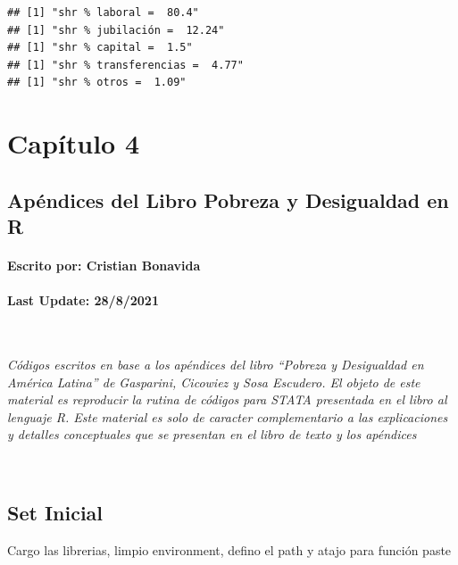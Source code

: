 \documentclass[
]{book}
\begin{document}
\begin{verbatim}
## [1] "shr % laboral =  80.4"
## [1] "shr % jubilación =  12.24"
## [1] "shr % capital =  1.5"
## [1] "shr % transferencias =  4.77"
## [1] "shr % otros =  1.09"
\end{verbatim}

\hypertarget{capuxedtulo-4}{%
\chapter{Capítulo 4}\label{capuxedtulo-4}}

\hypertarget{apuxe9ndices-del-libro-pobreza-y-desigualdad-en-r-2}{%
\section*{Apéndices del Libro Pobreza y Desigualdad en R}\label{apuxe9ndices-del-libro-pobreza-y-desigualdad-en-r-2}}

\hypertarget{escrito-por-cristian-bonavida-2}{%
\subsubsection*{Escrito por: Cristian Bonavida}\label{escrito-por-cristian-bonavida-2}}

\hypertarget{last-update-2882021}{%
\subsubsection*{Last Update: 28/8/2021}\label{last-update-2882021}}

~

\emph{Códigos escritos en base a los apéndices del libro ``Pobreza y Desigualdad en América Latina'' de Gasparini, Cicowiez y Sosa Escudero. El objeto de este material es reproducir la rutina de códigos para STATA presentada en el libro al lenguaje R. Este material es solo de caracter complementario a las explicaciones y detalles conceptuales que se presentan en el libro de texto y los apéndices}

~

\hypertarget{set-inicial-2}{%
\section*{Set Inicial}\label{set-inicial-2}}

Cargo las librerias, limpio environment, defino el path y atajo para función paste
\end{document}
